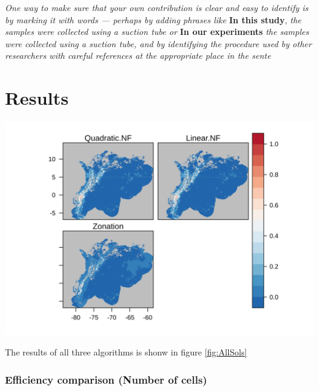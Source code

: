 \documentclass[]{article}
\begin{document}
\emph{One way to make sure that your own contribution is clear and easy
to identify is by marking it with words --- perhaps by adding phrases
like} \textbf{In this study}, \emph{the samples were collected using a suction tube or} \textbf{In
our experiments} \emph{the samples were collected using a suction tube, and by
identifying the procedure used by other researchers with careful references
at the appropriate place in the sente}

\hypertarget{results}{%
\section*{Results}\label{results}}

\includegraphics{NFPaper_files/figure-latex/AllSols-1.png}

The results of all three algorithms is shonw in figure \ref{fig:AllSols}

\hypertarget{efficiency-comparison-number-of-cells}{%
\subsubsection{Efficiency comparison (Number of cells)}\label{efficiency-comparison-number-of-cells}}
\end{document}
